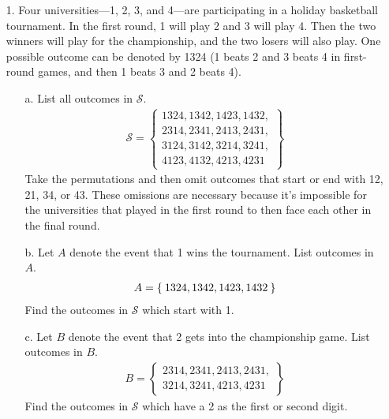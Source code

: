 \documentclass[letterpaper,12pt]{article}
\begin{document}
\maketitle

\begin{enumerate}
  \item[1.]
    Four universities---1, 2, 3, and 4---are participating in a holiday basketball tournament. In the first round, 1 will play 2 and 3 will play 4. Then the two winners will play for the championship, and the two losers will also play. One possible outcome can be denoted by 1324 (1 beats 2 and 3 beats 4 in first-round games, and then 1 beats 3 and 2 beats 4).
    \begin{enumerate}
      \item[a.]
        List all outcomes in $\mathcal{S}$.
        \begin{align*}
          \mathcal{S} =
          \left\{\begin{array}{l}
            1324, 1342, 1423, 1432, \\
            2314, 2341, 2413, 2431, \\
            3124, 3142, 3214, 3241, \\
            4123, 4132, 4213, 4231
          \end{array}\right\}
        \end{align*}
        Take the permutations and then omit outcomes that start or end with 12, 21, 34, or 43. These omissions are necessary because it's impossible for the universities that played in the first round to then face each other in the final round.
      \item[b.]
        Let $A$ denote the event that 1 wins the tournament. List outcomes in $A$.
        \begin{align*}
          A = \Set{1324, 1342, 1423, 1432}
        \end{align*}
        Find the outcomes in $\mathcal{S}$ which start with 1.
      \item[c.]
        Let $B$ denote the event that 2 gets into the championship game. List outcomes in $B$.
        \begin{align*}
          B =
          \left\{\begin{array}{l}
            2314, 2341, 2413, 2431, \\
            3214, 3241, 4213, 4231
          \end{array}\right\}
        \end{align*}
        Find the outcomes in $\mathcal{S}$ which have a 2 as the first or second digit.

\end{enumerate}
\end{enumerate}
\end{document}

